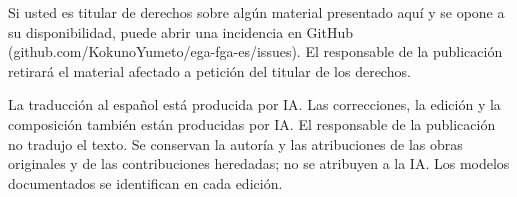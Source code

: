 \documentclass[10pt,oneside]{book}
\begin{document}
Si usted es titular de derechos sobre algún material presentado aquí y se opone a su disponibilidad, puede abrir una incidencia en GitHub (github.com/KokunoYumeto/ega-fga-es/issues). El responsable de la publicación retirará el material afectado a petición del titular de los derechos.

La traducción al español está producida por IA. Las correcciones, la edición y la composición también están producidas por IA. El responsable de la publicación no tradujo el texto. Se conservan la autoría y las atribuciones de las obras originales y de las contribuciones heredadas; no se atribuyen a la IA. Los modelos documentados se identifican en cada edición.
\par
\endgroup
\clearpage












\end{document}
